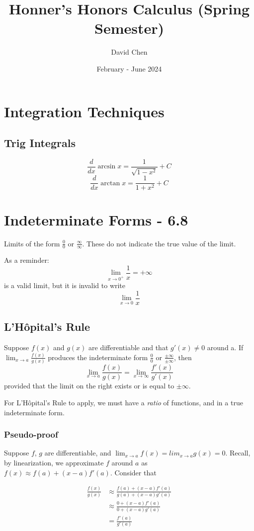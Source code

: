 \documentclass{article}
\title{Honner's Honors Calculus (Spring Semester)}
\author{David Chen}
\date{February - June 2024}
\begin{document}
\maketitle
\section{Integration Techniques}
\subsection{Trig Integrals}

$$ \frac{d}{dx} \arcsin{x} = \frac{1}{\sqrt{1 - x^2}} + C $$
$$ \frac{d}{dx} \arctan{x} = \frac{1}{1 + x^2} + C $$

\section{Indeterminate Forms - 6.8}
Limits of the form $\frac{0}{0}$ or $\frac{\infty}{\infty}$. These do not indicate the true value of the limit.

As a reminder:
$$\lim_{x \to 0^+} \frac{1}{x} = + \infty$$
is a valid limit, but it is invalid to write $$\lim_{x \to 0} \frac{1}{x}$$

\subsection{L'Hôpital's Rule}
Suppose $f(x)$ and $g(x)$ are differentiable and that $g'(x) \ne 0$ around a. If $\lim_{x\to a} \frac{f(x)}{g(x)}$ produces the indeterminate form $\frac{0}{0}$ or $\frac{\pm \infty}{\pm \infty}$, then $$\lim_{x \to a} \frac{f(x)}{g(x)} = \lim_{x \to \infty} \frac{f'(x)}{g'(x)}$$ provided that the limit on the right exists or is equal to $\pm \infty$.

For L'Hôpital's Rule to apply, we must have a \emph{ratio} of functions, and in a true indeterminate form.

\subsubsection{Pseudo-proof}
Suppose $f$, $g$ are differentiable, and $\lim_{x \to a} f(x) = lim_{x \to a} g(x) = 0$. Recall, by linearization, we approximate $f$ around $a$ as $f(x) \approx f(a) + (x-a)f'(a)$. Consider that                                                                                              

\begin{align*}
   \frac{f(x)}{g(x)} & \approx \frac{f(a) + (x-a)f'(a)}{g(a) + (x-a)g'(a)} \\
                     & \approx \frac{0 + (x-a)f'(a)}{0 + (x-a)g'(a)} \\
                     &       = \frac{f'(a)}{g'(a)}
\end{align*}
\end{document}
